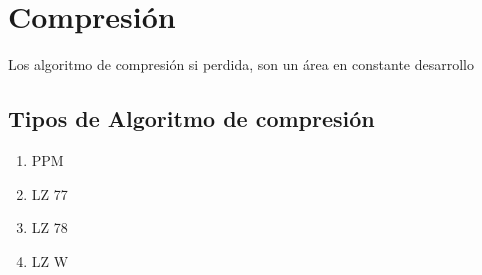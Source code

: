 \chapter[ML]{Compresión}
\label{ch:tema}

Los algoritmo de compresión si perdida, son un área en constante desarrollo




\section{Tipos de Algoritmo de compresión}
 
	\begin{enumerate}
		\item PPM
		\item LZ 77
		\item LZ 78
		\item LZ W
		
	 	
	\end{enumerate}
	
 
 
 
 

\nocite{*}
